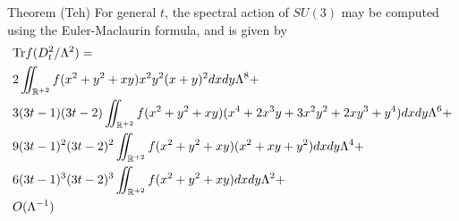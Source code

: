 \documentclass{beamer}
\def\R{{\mathbb R}}
\def\Tr{{\rm Tr}}
\begin{document}
\begin{frame}
	\begin{block}{Theorem (Teh)}
	For general $t$, the spectral action of $SU(3)$ may be computed using the Euler-Maclaurin formula, and is given by
		{\tiny
		\begin{align*}
	 		&\Tr f(D_t^2/ \Lambda^2) = \\
			& 2 \iint_{\R ^{+2}} f (x^2 + y^2 + xy)x^2y^2(x+y)^2 dxdy \Lambda^8 +\\
			&3(3t-1)(3t-2)\iint_{\R ^{+2}}f(x^2+y^2+xy)(x^4+2x^3y+3x^2y^2+2xy^3 +y^4)dxdy\Lambda^6 +\\
			&9(3t-1)^2(3t-2)^2\iint_{\R ^{+2}}f(x^2 + y^2+xy)(x^2+xy+y^2)dxdy\Lambda^4 +\\
			&6(3t-1)^3(3t-2)^3 \iint_{\R ^{+2}} f(x^2 + y^2 +xy)dxdy \Lambda^2+ \\
			&O(\Lambda^{-1})
		\end{align*}
		}
	\end{block}
\end{frame}
\end{document}
